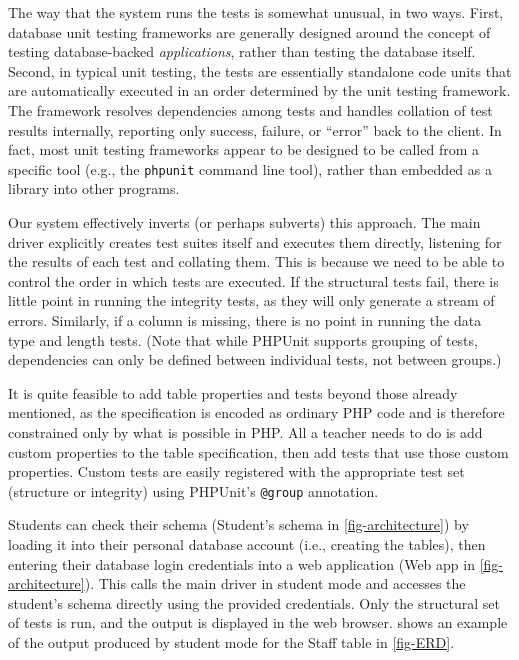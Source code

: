 \documentclass[sigconf, review, anonymous, capitalise]{acmart}
\begin{document}
The way that the system runs the tests is somewhat unusual, in two ways. First, database unit testing frameworks are generally designed around the concept of testing database-backed \emph{applications}, rather than testing the database itself. Second, in typical unit testing, the tests are essentially standalone code units that are automatically executed in an order determined by the unit testing framework. The framework resolves dependencies among tests and handles collation of test results internally, reporting only success, failure, or ``error'' back to the client. In fact, most unit testing frameworks appear to be designed to be called from a specific tool (e.g., the \texttt{phpunit} command line tool), rather than embedded as a library into other programs.

Our system effectively inverts (or perhaps subverts) this approach. The main driver explicitly creates test suites itself and executes them directly, listening for the results of each test and collating them. This is because we need to be able to control the order in which tests are executed. If the structural tests fail, there is little point in running the integrity tests, as they will only generate a stream of errors. Similarly, if a column is missing, there is no point in running the data type and length tests. (Note that while PHPUnit supports grouping of tests, dependencies can only be defined between individual tests, not between groups.)

It is quite feasible to add table properties and tests beyond those already mentioned, as the specification is encoded as ordinary PHP code and is therefore constrained only by what is possible in PHP. All a teacher needs to do is add custom properties to the table specification, then add tests that use those custom properties. Custom tests are easily registered with the appropriate test set (structure or integrity) using PHPUnit's \texttt{@group} annotation.

Students can check their schema (\textsf{Student's schema} in \cref{fig-architecture}) by loading it into their personal database account (i.e., creating the tables), then entering their database login credentials into a web application (\textsf{Web app} in \cref{fig-architecture}). This calls the main driver in student mode and accesses the student's schema directly using the provided credentials. Only the structural set of tests is run, and the output is displayed in the web browser.  shows an example of the output produced by student mode for the \textsf{Staff} table in \cref{fig-ERD}.
\end{document}
